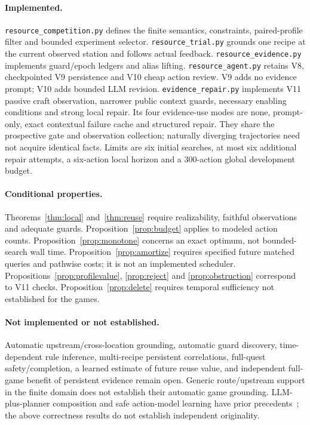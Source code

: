 \documentclass[11pt]{article}
\theoremstyle{definition}
\begin{document}
\paragraph{Implemented.}
\texttt{resource\_competition.py} defines the finite semantics, constraints,
paired-profile filter and bounded experiment selector.
\texttt{resource\_trial.py} grounds one recipe at the current observed station
and follows actual feedback.
\texttt{resource\_evidence.py} implements guard/epoch ledgers and alias lifting.
\texttt{resource\_agent.py} retains V8, checkpointed V9 persistence and V10
cheap action review. V9 adds no evidence prompt; V10 adds bounded LLM revision.
\texttt{evidence\_repair.py} implements V11 passive craft observation, narrower
public context guards, necessary enabling conditions and strong local repair.
Its four evidence-use modes are none, prompt-only, exact contextual failure
cache and structured repair. They share the prospective gate and observation
collection; naturally diverging trajectories need not acquire identical facts.
Limits are six initial searches, at most six additional repair attempts,
a six-action local horizon and a 300-action global development budget.

\paragraph{Conditional properties.}
Theorems~\ref{thm:local} and~\ref{thm:reuse} require realizability, faithful
observations and adequate guards. Proposition~\ref{prop:budget} applies to
modeled action counts. Proposition~\ref{prop:monotone} concerns an exact optimum,
not bounded-search wall time. Proposition~\ref{prop:amortize} requires specified
future matched queries and pathwise costs; it is not an implemented scheduler.
Propositions~\ref{prop:profilevalue}, \ref{prop:reject} and
\ref{prop:obstruction} correspond to V11 checks. Proposition~\ref{prop:delete}
requires temporal sufficiency not established for the games.

\paragraph{Not implemented or not established.}
Automatic upstream/cross-location grounding, automatic guard discovery,
time-dependent rule inference, multi-recipe persistent correlations, full-quest
safety/completion, a learned estimate of future reuse value, and independent
full-game benefit of persistent evidence remain open. Generic route/upstream
support in the finite domain does not establish their automatic game grounding.
LLM-plus-planner composition and safe action-model learning have prior
precedents~\cite{dagan2023,juba2021,mehta2011}; the above correctness results do
not establish independent originality.
\end{document}
